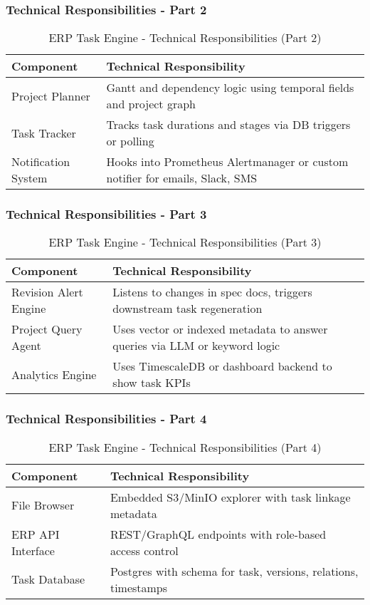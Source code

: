 \begin{frame}
    \frametitle{Technical Responsibilities - Part 2}
    \begin{table}[h!]
\centering
\renewcommand{\arraystretch}{1.2}
\begin{tabular}{|p{3cm}|p{7cm}|}
\hline
\textbf{Component} & \textbf{Technical Responsibility} \\
\hline
Project Planner & Gantt and dependency logic using temporal fields and project graph \\
\hline
Task Tracker & Tracks task durations and stages via DB triggers or polling \\
\hline
Notification System & Hooks into Prometheus Alertmanager or custom notifier for emails, Slack, SMS \\
\hline
\end{tabular}
\caption{ERP Task Engine - Technical Responsibilities (Part 2)}
\end{table}
\end{frame}

\begin{frame}
    \frametitle{Technical Responsibilities - Part 3}
    \begin{table}[h!]
\centering
\renewcommand{\arraystretch}{1.2}
\begin{tabular}{|p{3cm}|p{7cm}|}
\hline
\textbf{Component} & \textbf{Technical Responsibility} \\
\hline
Revision Alert Engine & Listens to changes in spec docs, triggers downstream task regeneration \\
\hline
Project Query Agent & Uses vector or indexed metadata to answer queries via LLM or keyword logic \\
\hline
Analytics Engine & Uses TimescaleDB or dashboard backend to show task KPIs \\
\hline
\end{tabular}
\caption{ERP Task Engine - Technical Responsibilities (Part 3)}
\end{table}
\end{frame}

\begin{frame}
    \frametitle{Technical Responsibilities - Part 4}
    \begin{table}[h!]
\centering
\renewcommand{\arraystretch}{1.2}
\begin{tabular}{|p{3cm}|p{7cm}|}
\hline
\textbf{Component} & \textbf{Technical Responsibility} \\
\hline
File Browser & Embedded S3/MinIO explorer with task linkage metadata \\
\hline
ERP API Interface & REST/GraphQL endpoints with role-based access control \\
\hline
Task Database & Postgres with schema for task, versions, relations, timestamps \\
\hline
\end{tabular}
\caption{ERP Task Engine - Technical Responsibilities (Part 4)}
\end{table}
\end{frame}

